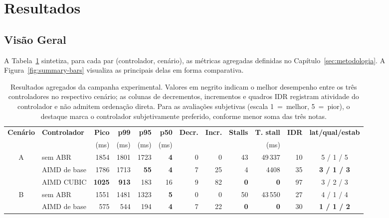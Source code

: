 
\section{Resultados}\label{sec:resultados}

\subsection{Visão Geral}

A Tabela~\ref{tab:results-full} sintetiza, para cada par
(controlador, cenário), as métricas agregadas definidas no
Capítulo~\ref{sec:metodologia}. A Figura~\ref{fig:summary-bars}
visualiza as principais delas em forma comparativa.

\begin{table}[!t]
  \caption{Resultados agregados da campanha experimental.
  Valores em negrito indicam o melhor desempenho entre os três
  controladores no respectivo cenário; as colunas de
  decrementos, incrementos e quadros IDR registram atividade do
  controlador e não admitem ordenação direta. Para as
  avaliações subjetivas (escala 1~=~melhor, 5~=~pior), o
  destaque marca o controlador subjetivamente preferido,
  conforme menor soma das três notas.}
  \label{tab:results-full}
  \centering
  \footnotesize
  \begin{tabular}{cl rrrr rr rr r c}
    \toprule
    \textbf{Cenário} & \textbf{Controlador} &
    \textbf{Pico} & \textbf{p99} & \textbf{p95} & \textbf{p50} &
    \textbf{Decr.} & \textbf{Incr.} &
    \textbf{Stalls} & \textbf{T. stall} & \textbf{IDR} &
    \textbf{lat/qual/estab} \\
    & & (ms) & (ms) & (ms) & (ms) & & & & (ms) & & \\
    \midrule
    \multirow{3}{*}{A} & sem ABR     & 1854 & 1801 & 1723 & \textbf{4} & 0 & 0 & 43 & 49\,337 & 10 & 5 / 1 / 5 \\
                      & AIMD de base & 1786 & 1713 & \textbf{55} & \textbf{4} & 7 & 25 & 4 & 4408 & 35 & \textbf{3 / 1 / 3} \\
                      & AIMD CUBIC   & \textbf{1025} & \textbf{913} & 183 & 16 & 9 & 82 & \textbf{0} & \textbf{0} & 97 & 3 / 2 / 3 \\
    \midrule
    \multirow{3}{*}{B} & sem ABR     & 1551 & 1481 & 1323 & \textbf{5} & 0 & 0 & 50 & 43\,550 & 27 & 4 / 1 / 4 \\
                      & AIMD de base & 575 & 544 & 194 & \textbf{4} & 7 & 22 & \textbf{0} & \textbf{0} & 30 & \textbf{1 / 1 / 2} \\

\end{tabular}
\end{table}
